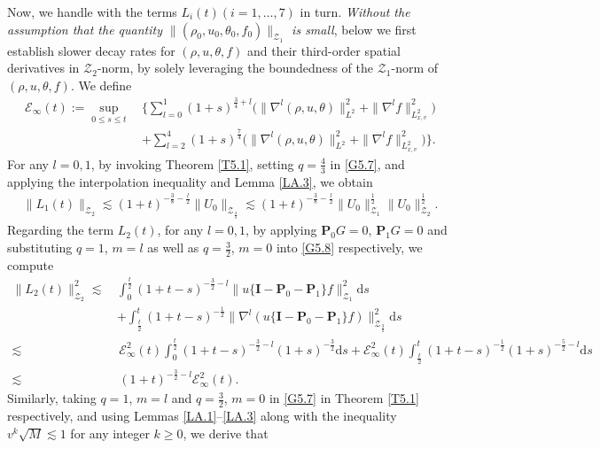 \documentclass[reqno,11pt]{amsart}
\theoremstyle{plain}
\numberwithin{equation}{section}
\begin{document}
Now, we handle with the terms $ L_i(t) (i=1,\dots, 7)$ in turn. 
\emph{Without the assumption that the quantity $\|(\rho_0, u_0, \theta_0, f_0)\|_{\mathcal{Z}_1}$  
  is small}, below we first establish slower decay rates for $(\rho, u, \theta, f)$ 
  and their third-order spatial derivatives in $\mathcal{Z}_2$-norm,
   by solely leveraging the boundedness of the $\mathcal{Z}_1$-norm of $(\rho, u, \theta, f)$.
We define
\begin{align}\label{G5.56}
\mathcal{E}_{\infty}(t):=\sup_{0\leq s\leq t}\,&\bigg\{\sum_{l=0}^1(1+s)^{\frac{3}{4}+l}\big(\|\nabla^l(\rho,u,\theta)\|_{L^2}^2 +\|\nabla^l f\|_{L_{x,v}^2}^2\big)\nonumber\\
&+\sum_{l=2}^4(1+s)^{\frac{7}{4}}\big(\|\nabla^l(\rho,u,\theta)\|_{L^2}^2+\|\nabla^l f\|_{L_{x,v}^2}^2 \big)   \bigg\}.
\end{align}
For any $l=0,1$, by invoking Theorem \ref{T5.1}, setting $q=\frac{4}{3}$ in \eqref{G5.7}, and applying the interpolation inequality
and Lemma \ref{LA.3}, we obtain   
\begin{align}\label{G5.57}
\|L_1(t)\|_{\mathcal{Z}_2}\lesssim (1+t)^{-\frac{3}{8}-\frac{l}{2}}\|U_0\|_{\mathcal{Z}_{\frac{4}{3}}}\lesssim (1+t)^{-\frac{3}{8}-\frac{l}{2}}\|U_0\|_{\mathcal{Z}_{1}}^\frac{1}{2}\|U_0\|_{\mathcal{Z}_{2}}^\frac{1}{2}.    
\end{align}
Regarding the term $L_2(t)$, for any $l=0,1$, by applying $\mathbf{P}_0G=0$, $\mathbf{P}_1 G=0$ and substituting $q=1$, $m=l$ as well as $q=\frac{3}{2}$, $m=0$ into \eqref{G5.8} respectively, we
compute
\begin{align}\label{G5.58}
\| L_2(t)\|_{\mathcal{Z}_2}^2\lesssim\,& \int_0^{\frac{t}{2}}(1+t-s)^{-\frac{3}{2}-l}
\| u\{\mathbf{I}-\mathbf{P}_0-\mathbf{P}_1\}f\|_{\mathcal{Z}_1}^2\mathrm{d}s\nonumber\\
&+ \int_{\frac{t}{2}}^t(1+t-s)^{-\frac{1}{2}}
\|\nabla^l ( u\{\mathbf{I}-\mathbf{P}_0-\mathbf{P}_1\}f)\|_{\mathcal{Z}_{\frac{3}{2}}}^2\mathrm{d}s\nonumber\\
\lesssim &\, \mathcal{E}_{ \infty}^2(t)\int_0^{\frac{t}{2}}(1+t-s)^{-\frac{3}{2}-l}
(1+s)^{-\frac{3}{2}}\mathrm{d}s +\mathcal{E}_{ \infty}^2(t)\int_{\frac{t}{2}}^t(1+t-s)^{-\frac{1}{2}}(1+s)^{-\frac{5}{2}-l}\mathrm{d}s\nonumber\\
\lesssim &\,(1+t)^{-\frac{3}{2}-l}\mathcal{E}_{\infty}^2(t).
\end{align}
Similarly, taking $q=1$, $m=l$ and $q=\frac{3}{2}$, $m=0$ in \eqref{G5.7} in Theorem \ref{T5.1} respectively, and  using Lemmas \ref{LA.1}--\ref{LA.3} along with the inequality $v^k\sqrt{M}\lesssim 1$ for any integer $k\geq 0$,  we derive that 
\end{document}

